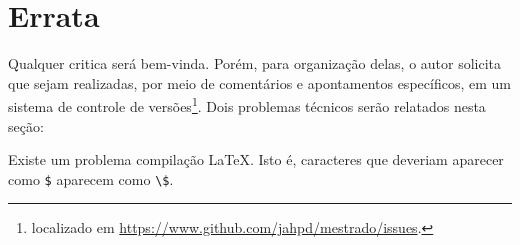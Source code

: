 \chapter*[Introdução]{Errata}

Qualquer critica será bem-vinda. Porém, para organização delas, o autor solicita que sejam realizadas, por meio de comentários e apontamentos específicos, em um sistema de controle de versões\footnote{localizado em \url{https://www.github.com/jahpd/mestrado/issues}.}. Dois problemas técnicos serão relatados nesta seção: 

Existe um problema compilação \LaTeX {}. Isto é, caracteres que deveriam aparecer como \verb|$| aparecem como \verb|\$|. 
